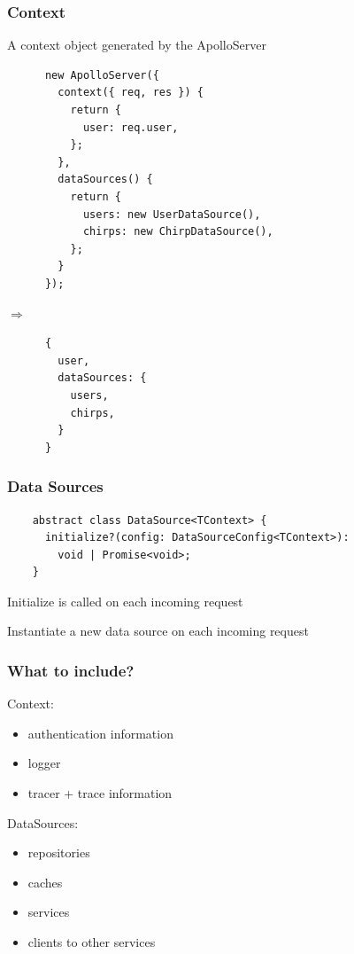 \documentclass{beamer}
\begin{document}
\begin{frame}[fragile]
  \frametitle{Context}
  A context object generated by the ApolloServer

  \vspace{1em}
  \begin{minipage}{0.6\linewidth}
    \begin{verbatim}
      new ApolloServer({
        context({ req, res }) {
          return {
            user: req.user,
          };
        },
        dataSources() {
          return {
            users: new UserDataSource(),
            chirps: new ChirpDataSource(),
          };
        }
      });
    \end{verbatim}
  \end{minipage}
  \begin{minipage}{0.05\linewidth}
    $\Rightarrow{}$
  \end{minipage}
  \begin{minipage}{0.25\linewidth}
    \begin{verbatim}
      {
        user,
        dataSources: {
          users,
          chirps,
        }
      }
    \end{verbatim}
  \end{minipage}
\end{frame}


\begin{frame}[fragile]
  \frametitle{Data Sources}
  \begin{verbatim}
    abstract class DataSource<TContext> {
      initialize?(config: DataSourceConfig<TContext>):
        void | Promise<void>;
    }
  \end{verbatim}

  \vspace{1em}
  Initialize is called on each incoming request

  \vspace{1em}
  Instantiate a new data source on each incoming request
\end{frame}


\begin{frame}
  \frametitle{What to include?}
  Context:
  \begin{itemize}
  \item authentication information
  \item logger
  \item tracer + trace information
  \end{itemize}

  \vspace{1em}
  DataSources:
  \begin{itemize}
  \item repositories
  \item caches
  \item services
  \item clients to other services
  \end{itemize}
\end{frame}
\end{document}

